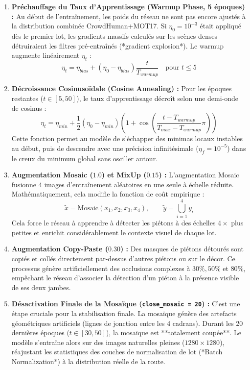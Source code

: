 \documentclass[11pt,a4paper]{article}
\begin{document}
\begin{enumerate}
    \item \textbf{Préchauffage du Taux d'Apprentissage (Warmup Phase, 5 époques) :}
    Au début de l'entraînement, les poids du réseau ne sont pas encore ajustés à la distribution combinée CrowdHuman+MOT17. Si $\eta_0 = 10^{-3}$ était appliqué dès le premier lot, les gradients massifs calculés sur les scènes denses détruiraient les filtres pré-entraînés (*gradient explosion*). Le warmup augmente linéairement $\eta_t$ :
    \begin{equation}
        \eta_t = \eta_{bias} + (\eta_0 - \eta_{bias}) \frac{t}{T_{warmup}} \quad \text{pour } t \le 5
    \end{equation}
    
    \item \textbf{Décroissance Cosinusoïdale (Cosine Annealing) :}
    Pour les époques restantes ($t \in [5, 50]$), le taux d'apprentissage décroît selon une demi-onde de cosinus :
    \begin{equation}
        \eta_t = \eta_{min} + \frac{1}{2} (\eta_0 - \eta_{min}) \left( 1 + \cos\left( \frac{t - T_{warmup}}{T_{max} - T_{warmup}} \pi \right) \right)
    \end{equation}
    Cette fonction permet au modèle de s'échapper des minimas locaux instables au début, puis de descendre avec une précision infinitésimale ($\eta_f = 10^{-5}$) dans le creux du minimum global sans osciller autour.

    \item \textbf{Augmentation Mosaic ($1.0$) et MixUp ($0.15$) :}
    L'augmentation Mosaic fusionne $4$ images d'entraînement aléatoires en une seule à échelle réduite. Mathématiquement, cela modifie la fonction de coût empirique :
    \begin{equation}
        \tilde{x} = \text{Mosaic}(x_1, x_2, x_3, x_4), \qquad \tilde{y} = \bigcup_{i=1}^4 y_i
    \end{equation}
    Cela force le réseau à apprendre à détecter les piétons à des échelles $4\times$ plus petites et enrichit considérablement le contexte visuel de chaque lot.

    \item \textbf{Augmentation Copy-Paste ($0.30$) :}
    Des masques de piétons détourés sont copiés et collés directement par-dessus d'autres piétons ou sur le décor. Ce processus génère artificiellement des occlusions complexes à $30\%, 50\%$ et $80\%$, empêchant le réseau d'associer la détection d'un piéton à la présence visible de ses deux jambes.

    \item \textbf{Désactivation Finale de la Mosaïque (\texttt{close\_mosaic = 20}) :}
    C'est une étape cruciale pour la stabilisation finale. La mosaïque génère des artefacts géométriques artificiels (lignes de jonction entre les 4 cadrans). Durant les 20 dernières époques ($t \in [30, 50]$), la mosaïque est **totalement coupée**. Le modèle s'entraîne alors sur des images naturelles pleines ($1280\times 1280$), réajustant les statistiques des couches de normalisation de lot (*Batch Normalization*) à la distribution réelle de la route.
\end{enumerate}
\end{document}

